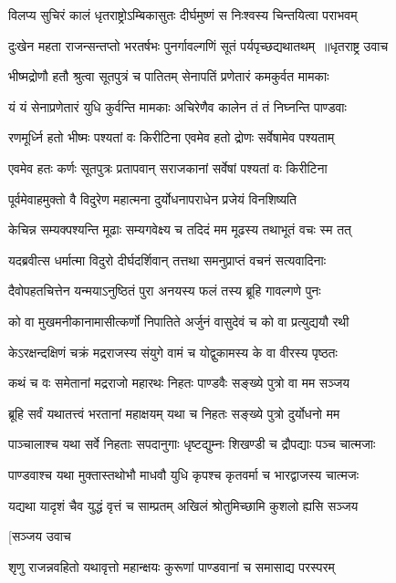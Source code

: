 \twolineshloka
{विलप्य सुचिरं कालं धृतराष्ट्रोऽम्बिकासुतः}
{दीर्घमुष्णं स निःश्वस्य चिन्तयित्वा पराभवम्}


\threelineshloka
{दुःखेन महता राजन्सन्तप्तो भरतर्षभः}
{पुनर्गावल्गणिं सूतं पर्यपृच्छद्यथातथम् ॥धृतराष्ट्र उवाच}
{}


\twolineshloka
{भीष्मद्रोणौ हतौ श्रुत्वा सूतपुत्रं च पातितम्}
{सेनापतिं प्रणेतारं कमकुर्वत मामकाः}


\twolineshloka
{यं यं सेनाप्रणेतारं युधि कुर्वन्ति मामकाः}
{अचिरेणैव कालेन तं तं निघ्नन्ति पाण्डवाः}


\twolineshloka
{रणमूर्ध्नि हतो भीष्मः पश्यतां वः किरीटिना}
{एवमेव हतो द्रोणः सर्वेषामेव पश्यताम्}


\twolineshloka
{एवमेव हतः कर्णः सूतपुत्रः प्रतापवान्}
{सराजकानां सर्वेषां पश्यतां वः किरीटिना}


\twolineshloka
{पूर्वमेवाहमुक्तो वै विदुरेण महात्मना}
{दुर्योधनापराधेन प्रजेयं विनशिष्यति}


\twolineshloka
{केचिन्न सम्यक्पश्यन्ति मूढाः सम्यगवेक्ष्य च}
{तदिदं मम मूढस्य तथाभूतं वचः स्म तत्}


\twolineshloka
{यदब्रवीत्स धर्मात्मा विदुरो दीर्घदर्शिवान्}
{तत्तथा समनुप्राप्तं वचनं सत्यवादिनाः}


\twolineshloka
{दैवोपहतचित्तेन यन्मयाऽनुष्ठितं पुरा}
{अनयस्य फलं तस्य ब्रूहि गावल्गणे पुनः}


\twolineshloka
{को वा मुखमनीकानामासीत्कर्णो निपातिते}
{अर्जुनं वासुदेवं च को वा प्रत्युद्ययौ रथी}


\twolineshloka
{केऽरक्षन्दक्षिणं चक्रं मद्रराजस्य संयुगे}
{वामं च योद्वुकामस्य के वा वीरस्य पृष्ठतः}


\twolineshloka
{कथं च वः समेतानां मद्रराजो महारथः}
{निहतः पाण्डवैः सङ्ख्ये पुत्रो वा मम सञ्जय}


\twolineshloka
{ब्रूहि सर्वं यथातत्त्वं भरतानां महाक्षयम्}
{यथा च निहतः सङ्ख्ये पुत्रो दुर्योधनो मम}


\twolineshloka
{पाञ्चालाश्च यथा सर्वे निहताः सपदानुगाः}
{धृष्टद्युम्नः शिखण्डी च द्रौपद्याः पञ्च चात्मजाः}


\twolineshloka
{पाण्डवाश्च यथा मुक्तास्तथोभौ माधवौ युधि}
{कृपश्च कृतवर्मा च भारद्वाजस्य चात्मजः}


\twolineshloka
{यद्यथा यादृशं चैव युद्धं वृत्तं च साम्प्रतम्}
{अखिलं श्रोतुमिच्छामि कुशलो ह्यसि सञ्जय}


\twolineshloka
{[सञ्जय उवाच}
{}


\twolineshloka
{शृणु राजन्नवहितो यथावृत्तो महान्क्षयः}
{कुरूणां पाण्डवानां च समासाद्य परस्परम्}


